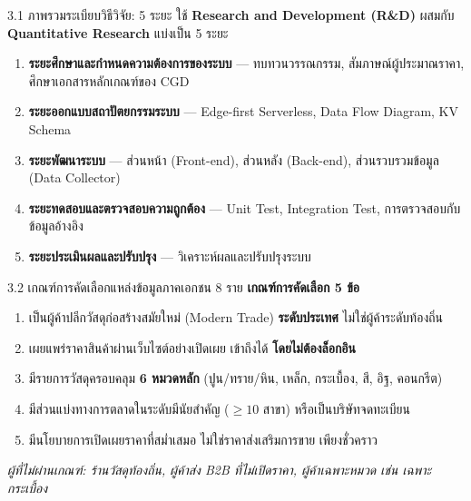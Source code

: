 \documentclass[aspectratio=169,11pt]{beamer}
\begin{document}
\begin{frame}{3.1 ภาพรวมระเบียบวิธีวิจัย: 5 ระยะ}
  ใช้ \textbf{Research and Development (R\&D)} ผสมกับ \textbf{Quantitative Research}
  แบ่งเป็น 5 ระยะ
  \begin{enumerate}
    \item \textbf{ระยะศึกษาและกำหนดความต้องการของระบบ} --- ทบทวนวรรณกรรม,
          สัมภาษณ์ผู้ประมาณราคา, ศึกษาเอกสารหลักเกณฑ์ของ CGD
    \item \textbf{ระยะออกแบบสถาปัตยกรรมระบบ} --- Edge-first Serverless,
          Data Flow Diagram, KV Schema
    \item \textbf{ระยะพัฒนาระบบ} --- ส่วนหน้า (Front-end), ส่วนหลัง (Back-end),
          ส่วนรวบรวมข้อมูล (Data Collector)
    \item \textbf{ระยะทดสอบและตรวจสอบความถูกต้อง} --- Unit Test, Integration Test,
          การตรวจสอบกับข้อมูลอ้างอิง
    \item \textbf{ระยะประเมินผลและปรับปรุง} --- วิเคราะห์ผลและปรับปรุงระบบ
  \end{enumerate}
\end{frame}

\begin{frame}{3.2 เกณฑ์การคัดเลือกแหล่งข้อมูลภาคเอกชน 8 ราย}
  \textbf{เกณฑ์การคัดเลือก 5 ข้อ}
  \begin{enumerate}
    \item เป็นผู้ค้าปลีกวัสดุก่อสร้างสมัยใหม่ (Modern Trade) \textbf{ระดับประเทศ}
          ไม่ใช่ผู้ค้าระดับท้องถิ่น
    \item เผยแพร่ราคาสินค้าผ่านเว็บไซต์อย่างเปิดเผย เข้าถึงได้
          \textbf{โดยไม่ต้องล็อกอิน}
    \item มีรายการวัสดุครอบคลุม \textbf{6 หมวดหลัก} (ปูน/ทราย/หิน, เหล็ก,
          กระเบื้อง, สี, อิฐ, คอนกรีต)
    \item มีส่วนแบ่งทางการตลาดในระดับมีนัยสำคัญ ($\geq 10$ สาขา)
          หรือเป็นบริษัทจดทะเบียน
    \item มีนโยบายการเปิดเผยราคาที่สม่ำเสมอ ไม่ใช่ราคาส่งเสริมการขาย
          เพียงชั่วคราว
  \end{enumerate}
  \vspace{0.3em}
  \footnotesize\emph{ผู้ที่ไม่ผ่านเกณฑ์: ร้านวัสดุท้องถิ่น, ผู้ค้าส่ง B2B
  ที่ไม่เปิดราคา, ผู้ค้าเฉพาะหมวด เช่น เฉพาะกระเบื้อง}
\end{frame}
\end{document}
